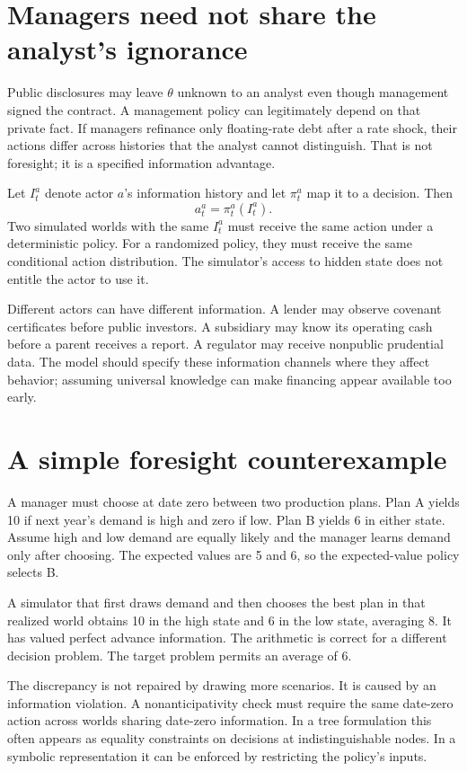 \section{Managers need not share the analyst's ignorance}
Public disclosures may leave $\theta$ unknown to an analyst even though management signed the contract. A management policy can legitimately depend on that private fact. If managers refinance only floating-rate debt after a rate shock, their actions differ across histories that the analyst cannot distinguish. That is not foresight; it is a specified information advantage.

Let $I_t^a$ denote actor $a$'s information history and let $\pi_t^a$ map it to a decision. Then
\begin{equation}
 a_t^a=\pi_t^a(I_t^a).
 \label{sim:actor-policy}
\end{equation}
Two simulated worlds with the same $I_t^a$ must receive the same action under a deterministic policy. For a randomized policy, they must receive the same conditional action distribution. The simulator's access to hidden state does not entitle the actor to use it.

Different actors can have different information. A lender may observe covenant certificates before public investors. A subsidiary may know its operating cash before a parent receives a report. A regulator may receive nonpublic prudential data. The model should specify these information channels where they affect behavior; assuming universal knowledge can make financing appear available too early.

\section{A simple foresight counterexample}
A manager must choose at date zero between two production plans. Plan A yields 10 if next year's demand is high and zero if low. Plan B yields 6 in either state. Assume high and low demand are equally likely and the manager learns demand only after choosing. The expected values are 5 and 6, so the expected-value policy selects B.

A simulator that first draws demand and then chooses the best plan in that realized world obtains 10 in the high state and 6 in the low state, averaging 8. It has valued perfect advance information. The arithmetic is correct for a different decision problem. The target problem permits an average of 6.

The discrepancy is not repaired by drawing more scenarios. It is caused by an information violation. A nonanticipativity check must require the same date-zero action across worlds sharing date-zero information. In a tree formulation this often appears as equality constraints on decisions at indistinguishable nodes. In a symbolic representation it can be enforced by restricting the policy's inputs.

